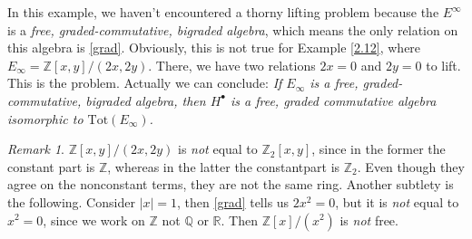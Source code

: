 \documentclass[a4paper,11pt]{article}
\theoremstyle{definition}
\theoremstyle{remark}
\newtheorem{remark}[theorem]{Remark}
\begin{document}
In this example, we haven't encountered a thorny lifting problem because the $E^\infty$ is a {\itshape  free, graded-commutative, bigraded algebra}, which means the only relation on this algebra is \cref{grad}. Obviously, this is not true for Example \ref{2.12}, where $E_\infty=\mathbb{Z}[x,y]/(2x,2y)$. There, we have two relations $2x=0$ and $2y=0$ to lift. This is the problem. Actually we can conclude: {\itshape If $E_\infty$ is a free, graded-commutative, bigraded algebra, then $H^\bullet$ is a free, graded commutative algebra isomorphic to $\mathrm{Tot}(E_\infty)$.}
\begin{remark}
	$\mathbb{Z}[x,y]/(2x,2y)$ is {\itshape not} equal to $\mathbb{Z}_2[x,y]$, since in the former the constant part is $\mathbb{Z}$, whereas in the latter the constantpart is $\mathbb{Z}_2$. Even though they agree on the nonconstant terms, they are not the same ring. Another subtlety is the following. Consider $|x|=1$, then \cref{grad} tells us $2x^2=0$, but it is {\itshape not} equal to $x^2=0$, since we work on $\mathbb{Z}$ not $\mathbb{Q}$ or $\mathbb{R}$. Then $\mathbb{Z}[x]/(x^2)$ is {\itshape not} free. 
\end{remark}
\end{document}
